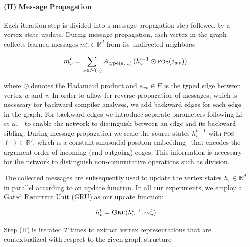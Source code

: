 \paragraph{(II) Message Propagation} Each iteration step is divided
into a message propagation step followed by a vertex state
update. During message propagation, each vertex in the graph collects
learned messages $m_v^{t} \in \mathbb{R}^d$ from its undirected
neighbors:

\begin{equation}
  m^t_{v} = \sum_{w \in \mathcal{N}(v)} A_{\mathrm{type}(e_{wv})}\,  (h_w^{t-1} \odot \textsc{pos}(e_{wv}))\,
\end{equation}

where $\odot$ denotes the Hadamard product and $e_{wv} \in E$ is the
typed edge between vertex $w$ and $v$. In order to allow for
reverse-propagation of messages, which is necessary for backward
compiler analyses, we add backward edges for each edge in the
graph. For backward edges we introduce separate parameters following
Li et al.~\cite{Li2015a} to enable the network to distinguish between
an edge and its backward sibling. During message propagation we scale
the source states $h_v^{t-1}$ with
\textsc{pos}$(\cdot) \in \mathbb{R}^d$, which is a constant sinusoidal
position embedding~\cite{Vaswani2017,Gehring2017} that encodes the
argument order of incoming (and outgoing) edges. This information is
necessary for the network to distinguish non-commutative operations
such as division.

The collected messages are subsequently used to update the vertex
states $h_{v} \in \mathbb{R}^d$ in parallel according to an update
function. In all our experiments, we employ a Gated Recurrent Unit
(GRU) \cite{Cho2014} as our update function:

\begin{equation}
h_v^t = \textsc{Gru}(h_v^{t-1}, m_v^t)
\end{equation}

Step (II) is iterated $T$ times to extract vertex representations that
are contextualized with respect to the given graph structure.


